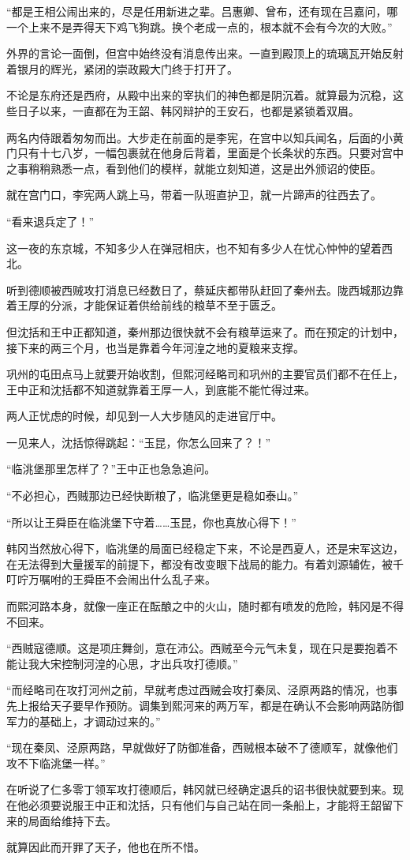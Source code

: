 “都是王相公闹出来的，尽是任用新进之辈。吕惠卿、曾布，还有现在吕嘉问，哪一个上来不是弄得天下鸡飞狗跳。换个老成一点的，根本就不会有今次的大败。”

外界的言论一面倒，但宫中始终没有消息传出来。一直到殿顶上的琉璃瓦开始反射着银月的辉光，紧闭的崇政殿大门终于打开了。

不论是东府还是西府，从殿中出来的宰执们的神色都是阴沉着。就算最为沉稳，这些日子以来，一直都在为王韶、韩冈辩护的王安石，也都是紧锁着双眉。

两名内侍跟着匆匆而出。大步走在前面的是李宪，在宫中以知兵闻名，后面的小黄门只有十七八岁，一幅包裹就在他身后背着，里面是个长条状的东西。只要对宫中之事稍稍熟悉一点，看到他们的模样，就能立刻知道，这是出外颁诏的使臣。

就在宫门口，李宪两人跳上马，带着一队班直护卫，就一片蹄声的往西去了。

“看来退兵定了！”

这一夜的东京城，不知多少人在弹冠相庆，也不知有多少人在忧心忡忡的望着西北。

听到德顺被西贼攻打消息已经数日了，蔡延庆都带队赶回了秦州去。陇西城那边靠着王厚的分派，才能保证着供给前线的粮草不至于匮乏。

但沈括和王中正都知道，秦州那边很快就不会有粮草运来了。而在预定的计划中，接下来的两三个月，也当是靠着今年河湟之地的夏粮来支撑。

巩州的屯田点马上就要开始收割，但熙河经略司和巩州的主要官员们都不在任上，王中正和沈括都不知道就靠着王厚一人，到底能不能忙得过来。

两人正忧虑的时候，却见到一人大步随风的走进官厅中。

一见来人，沈括惊得跳起：“玉昆，你怎么回来了？！”

“临洮堡那里怎样了？”王中正也急急追问。

“不必担心，西贼那边已经快断粮了，临洮堡更是稳如泰山。”

“所以让王舜臣在临洮堡下守着……玉昆，你也真放心得下！”

韩冈当然放心得下，临洮堡的局面已经稳定下来，不论是西夏人，还是宋军这边，在无法得到大量援军的前提下，都没有改变眼下战局的能力。有着刘源辅佐，被千叮咛万嘱咐的王舜臣不会闹出什么乱子来。

而熙河路本身，就像一座正在酝酿之中的火山，随时都有喷发的危险，韩冈是不得不回来。

“西贼寇德顺。这是项庄舞剑，意在沛公。西贼至今元气未复，现在只是要抱着不能让我大宋控制河湟的心思，才出兵攻打德顺。”

“而经略司在攻打河州之前，早就考虑过西贼会攻打秦凤、泾原两路的情况，也事先上报给天子要早作预防。调集到熙河来的两万军，都是在确认不会影响两路防御军力的基础上，才调动过来的。”

“现在秦凤、泾原两路，早就做好了防御准备，西贼根本破不了德顺军，就像他们攻不下临洮堡一样。”

在听说了仁多零丁领军攻打德顺后，韩冈就已经确定退兵的诏书很快就要到来。现在他必须要说服王中正和沈括，只有他们与自己站在同一条船上，才能将王韶留下来的局面给维持下去。

就算因此而开罪了天子，他也在所不惜。


